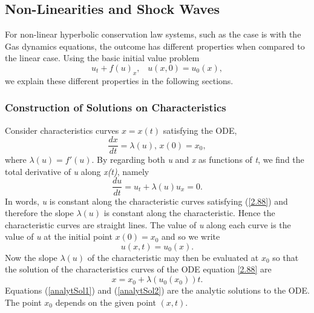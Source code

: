 \documentclass[]{article}
\begin{document}
	\subsection{Non-Linearities and Shock Waves}
		For non-linear hyperbolic conservation law systems, such as the case is with the Gas dynamics equations, the outcome has different properties when compared to the linear case. Using the basic initial value problem 
		\begin{equation}
			u_t + f(u)_x  \mbox{, } \mbox{  }u(x,0) = u_0(x),
			\label{IVP1}
		\end{equation} we explain these different properties in the following sections.		
		
		\subsubsection{Construction of Solutions on Characteristics}
			Consider characteristics curves $ x = x(t) $ satisfying the ODE,
			\begin{equation}
				\frac{dx}{dt} = \lambda(u) \mbox{, } x(0) = x_0,
				\label{2.88}
			\end{equation}
			where $ \lambda(u) = f'(u) $. By regarding both \textit{u} and \textit{x} as functions of \textit{t}, we find the total derivative  of \textit{u} along \textit{x(t)}, namely
			\begin{equation}
				\frac{du}{dt} = u_t + \lambda(u)u_x = 0.
			\end{equation}	
			In words, \textit{u} is constant along the characteristic curves satisfying (\ref{2.88}) and therefore the slope $ \lambda(u) $ is constant along the characteristic. Hence the characteristic curves are straight lines. The value of \textit{u} along each curve is the value of \textit{u} at the initial point $ x(0) = x_0 $ and so we write
			\begin{equation}
				u(x,t) = u_0(x).
				\label{analytSol1}
			\end{equation}
			Now the slope $ \lambda(u) $ of the characteristic may then be evaluated at $ x_0 $ so that the solution of the characteristics curves of the ODE equation \ref{2.88} are
			\begin{equation}
				x = x_0 + \lambda(u_0(x_0))t.
				\label{analytSol2}
			\end{equation}
			Equations (\ref{analytSol1}) and (\ref{analytSol2}) are the analytic solutions to the ODE. The point $ x_0 $ depends on the given point $ (x,t) $.
		
\end{document}
